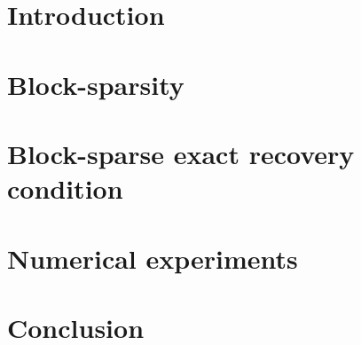 
\section{Introduction}

\section{Block-sparsity}
\label{sec:Our_Block-sparsity} 

\newpage
\section{Block-sparse exact recovery condition}
\label{sec:Our_BERC} 

\newpage
\section{Numerical experiments}
\label{sec:Numerical_experiments} 

\section{Conclusion}
\label{sec:Our_Conclusion}
